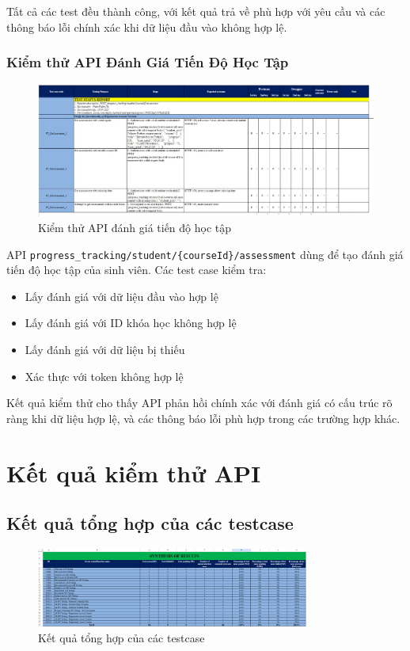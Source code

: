 Tất cả các test đều thành công, với kết quả trả về phù hợp với yêu cầu và các thông báo lỗi chính xác khi dữ liệu đầu vào không hợp lệ.

\subsubsection{Kiểm thử API Đánh Giá Tiến Độ Học Tập}
\begin{figure}[H]
	\centering
	\includegraphics[width=0.8\linewidth]{images/test/test_S1G16.png}
	\caption{Kiểm thử API đánh giá tiến độ học tập}
	\label{fig:testting_evaluation}
\end{figure}
API \texttt{progress\_tracking/student/\{courseId\}/assessment} dùng để tạo đánh giá tiến độ học tập của sinh viên. Các test case kiểm tra:
\begin{itemize}
    \item Lấy đánh giá với dữ liệu đầu vào hợp lệ
    \item Lấy đánh giá với ID khóa học không hợp lệ
    \item Lấy đánh giá với dữ liệu bị thiếu
    \item Xác thực với token không hợp lệ
\end{itemize}

Kết quả kiểm thử cho thấy API phản hồi chính xác với đánh giá có cấu trúc rõ ràng khi dữ liệu hợp lệ, và các thông báo lỗi phù hợp trong các trường hợp khác.

\section{Kết quả kiểm thử API}
\subsection{Kết quả tổng hợp của các testcase}
\begin{figure}[H]
    \centering
    \includegraphics[width=0.8\textwidth]{Images/test/test_summary.png}
    \caption{Kết quả tổng hợp của các testcase}
\end{figure}

